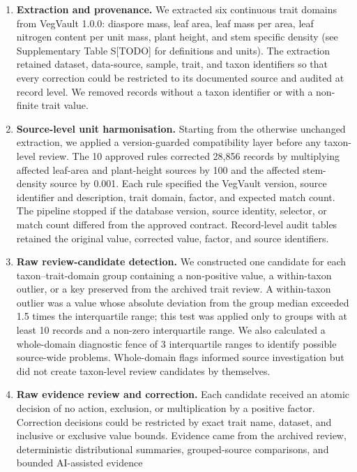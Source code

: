 \documentclass[
  12pt,
]{article}
\begin{document}
\begin{enumerate}
\def\labelenumi{\arabic{enumi}.}
\item
  \textbf{Extraction and provenance.} We extracted six continuous trait
  domains from VegVault 1.0.0: diaspore mass, leaf area, leaf mass per
  area, leaf nitrogen content per unit mass, plant height, and stem
  specific density (see Supplementary Table S{[}TODO{]} for definitions
  and units). The extraction retained dataset, data-source, sample,
  trait, and taxon identifiers so that every correction could be
  restricted to its documented source and audited at record level. We
  removed records without a taxon identifier or with a non-finite trait
  value.
\item
  \textbf{Source-level unit harmonisation.} Starting from the otherwise
  unchanged extraction, we applied a version-guarded compatibility layer
  before any taxon-level review. The 10 approved rules corrected 28,856
  records by multiplying affected leaf-area and plant-height sources by
  100 and the affected stem-density source by 0.001. Each rule specified
  the VegVault version, source identifier and description, trait domain,
  factor, and expected match count. The pipeline stopped if the database
  version, source identity, selector, or match count differed from the
  approved contract. Record-level audit tables retained the original
  value, corrected value, factor, and source identifiers.
\item
  \textbf{Raw review-candidate detection.} We constructed one candidate
  for each taxon--trait-domain group containing a non-positive value, a
  within-taxon outlier, or a key preserved from the archived trait
  review. A within-taxon outlier was a value whose absolute deviation
  from the group median exceeded 1.5 times the interquartile range; this
  test was applied only to groups with at least 10 records and a
  non-zero interquartile range. We also calculated a whole-domain
  diagnostic fence of 3 interquartile ranges to identify possible
  source-wide problems. Whole-domain flags informed source investigation
  but did not create taxon-level review candidates by themselves.
\item
  \textbf{Raw evidence review and correction.} Each candidate received
  an atomic decision of no action, exclusion, or multiplication by a
  positive factor. Correction decisions could be restricted by exact
  trait name, dataset, and inclusive or exclusive value bounds. Evidence
  came from the archived review, deterministic distributional summaries,
  grouped-source comparisons, and bounded AI-assisted evidence

\end{enumerate}
\end{document}
